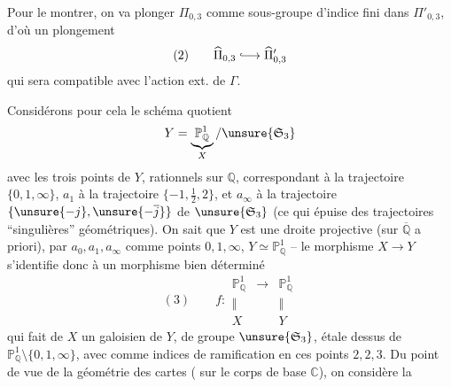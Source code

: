 Pour le montrer, on va plonger
$\Pi_{0,3}$ comme sous-groupe d'indice fini
dans $\Pi'_{0,3}$, d'où un plongement 
\[
(2)\qquad\widehat{\Pi}_{0,3}\lhook\joinrel\longrightarrow\widehat{\Pi}'_{0,3}
\]
qui sera compatible avec l'action ext. de $\Gamma$.


Considérons pour cela le schéma quotient
\[
Y=\underbrace{\mathbb P^1_{\mathbb Q}}_{X}/\unsure{\mathfrak S_3}
\]
avec les trois points  de $Y$, rationnels sur
$\mathbb Q$,  correspondant à la trajectoire
 $\{0,1,\infty\}$, $a_1$ à la trajectoire
$\{-1,\frac12,2\}$, et $a_\infty$ à la trajectoire
$\{\unsure{-j},\unsure{-\overline j}\}$ de $\unsure{\mathfrak S_3}$
(ce qui épuise  des trajectoires
``singulières'' géométriques). On sait que $Y$ est une droite projective
(sur $\overline{\mathbb Q}$ a priori),   par
$a_0,a_1,a_\infty$ comme points $0,1,\infty$, 
$Y\simeq\mathbb P^1_{\mathbb Q}$ -- le  morphisme
$X\longrightarrow Y$ s'identifie donc à un morphisme bien déterminé
\[
(3)\qquad
f:\begin{array}{ccc}
\mathbb P^1_{\mathbb Q}&\longrightarrow&\mathbb P^1_{\mathbb Q}\\
\Vert&&\Vert\\
X&&Y
\end{array}
\]
qui fait de $X$ un  galoisien de $Y$, de groupe
$\unsure{\mathfrak S_3}$, étale  dessus de
$\mathbb P^1_{\mathbb Q}\setminus\{0,1,\infty\}$, avec comme indices de
ramification en ces points $2,2,3$. Du point de vue de la géométrie des cartes
( sur le corps de base $\mathbb C$), on considère la


